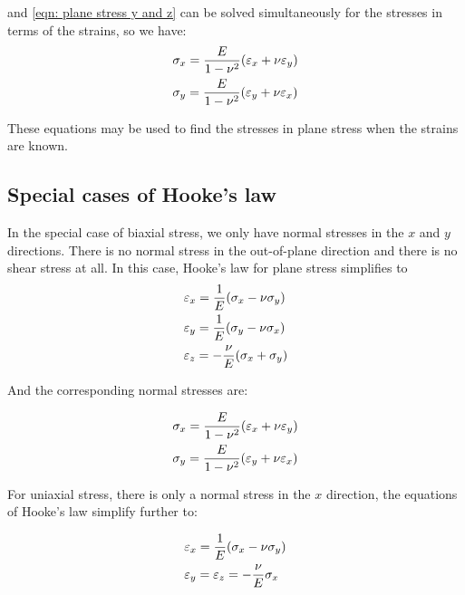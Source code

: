 \documentclass[
fontsize=10pt,
a4paper,
twosides=false,
open=any,
svgnames,
]{kaobook} %
\begin{document}
 and \cref{eqn: plane stress y and z} can be solved simultaneously for the stresses in terms of the strains, so we have:
\begin{equation}
  \begin{gathered}
    \sigma_x = \frac{E}{1 - \nu^2}(\varepsilon_x + \nu \varepsilon_y) \hfill \\
    \sigma_y = \frac{E}{1 - \nu^2}(\varepsilon_y + \nu \varepsilon_x) \hfill \\ 
  \end{gathered}
\end{equation}

These equations may be used to find the stresses in plane stress when the strains are known.

\subsection{Special cases of Hooke’s law}

In the special case of biaxial stress, we only have normal stresses in the $x$ and $y$ directions. There is no normal stress in the out-of-plane direction and there is no shear stress at all. In this case, Hooke’s law for plane stress simplifies to
\begin{equation}
  \begin{gathered}
    \varepsilon_x = \frac{1}{E}(\sigma_x - \nu \sigma_y) \hfill \\
    \varepsilon_y = \frac{1}{E}(\sigma_y - \nu \sigma_x) \hfill \\
    \varepsilon_z =  - \frac{\nu }{E}(\sigma_x + \sigma_y) \hfill \\ 
  \end{gathered}
\end{equation}

And the corresponding normal stresses are:

\begin{equation}
  \begin{gathered}
    \sigma_x = \frac{E}{1 - \nu^2}(\varepsilon_x + \nu \varepsilon_y) \hfill \\
    \sigma_y = \frac{E}{1 - \nu^2}(\varepsilon_y + \nu \varepsilon_x) \hfill
  \end{gathered}
\end{equation}

For uniaxial stress, there is only a normal stress in the $x$ direction, the equations of Hooke’s law simplify further to:

\begin{equation}
  \begin{gathered}
    \varepsilon_x = \frac{1}{E}({\sigma _x} - \nu \sigma_y) \hfill \\
    \varepsilon_y = {\varepsilon _z} =  - \frac{\nu }{E}{\sigma _x} \hfill \\ 
  \end{gathered}
\end{equation}
\end{document}
